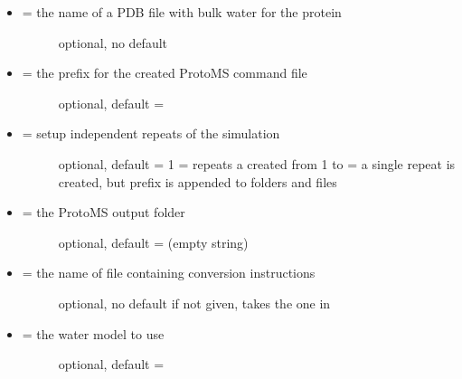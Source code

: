 \documentclass[letterpaper,10pt,english]{sphinxmanual}
\begin{document}
\begin{itemize}
\item {} \begin{description}
\item[{ = the name of a PDB file with bulk water for the protein}] \leavevmode
optional, no default

\end{description}

\item {} \begin{description}
\item[{ = the prefix for the created ProtoMS command file}] \leavevmode
optional, default = 

\end{description}

\item {} \begin{description}
\item[{ = setup independent repeats of the simulation}] \leavevmode
optional, default = 1
 = repeats a created from 1 to 
 = a single repeat is created, but prefix is appended to folders and files

\end{description}

\item {} \begin{description}
\item[{ = the ProtoMS output folder}] \leavevmode
optional, default =  (empty string)

\end{description}

\item {} \begin{description}
\item[{ = the name of file containing conversion instructions}] \leavevmode
optional, no default
if not given, takes the one in 

\end{description}

\item {} \begin{description}
\item[{ = the water model to use}] \leavevmode
optional, default = 

\end{description}


\end{itemize}
\end{document}
